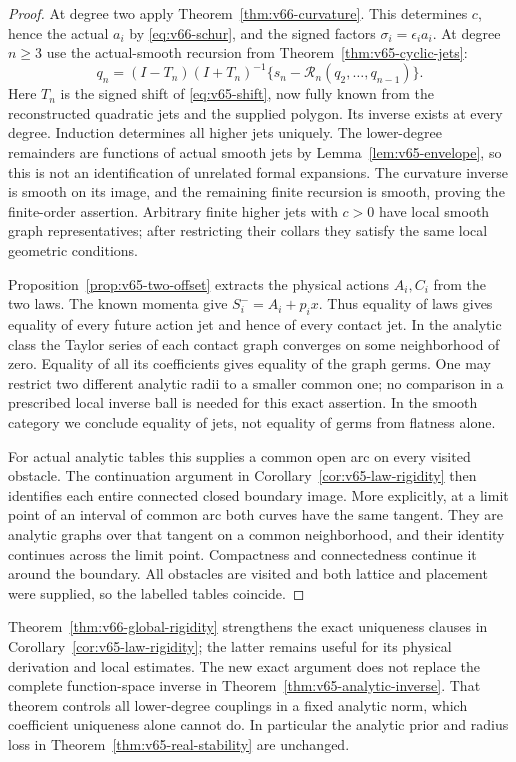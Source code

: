 \begin{proof}
At degree two apply Theorem~\ref{thm:v66-curvature}.  This determines
$c$, hence the actual $a_i$ by \eqref{eq:v66-schur}, and the signed
factors $\sigma_i=\epsilon_i a_i$.  At degree $n\ge3$ use the
actual-smooth recursion from Theorem~\ref{thm:v65-cyclic-jets}:
\[
 q_n=(I-T_n)(I+T_n)^{-1}
                 \{s_n-\mathcal R_n(q_2,\ldots,q_{n-1})\}.
\]
Here $T_n$ is the signed shift of \eqref{eq:v65-shift}, now fully
known from the reconstructed quadratic jets and the supplied polygon.
Its inverse exists at every degree.  Induction determines all higher
jets uniquely.  The lower-degree remainders are functions of actual
smooth jets by Lemma~\ref{lem:v65-envelope}, so this is not an
identification of unrelated formal expansions.  The curvature inverse is
smooth on its image, and the remaining finite recursion is smooth, proving
the finite-order assertion.  Arbitrary finite higher jets with $c>0$
have local smooth graph representatives; after restricting their collars
they satisfy the same local geometric conditions.

Proposition~\ref{prop:v65-two-offset} extracts the physical actions
$A_i,C_i$ from the two laws.  The known momenta give
$S_i^-=A_i+p_i x$.  Thus equality of laws gives equality of every
future action jet and hence of every contact jet.  In the analytic class
the Taylor series of each contact graph converges on some neighborhood
of zero.  Equality of all its coefficients gives equality of the graph
germs.  One may restrict two different analytic radii to a smaller common
one; no comparison in a prescribed local inverse ball is needed for this
exact assertion.  In the smooth category we conclude equality of jets,
not equality of germs from flatness alone.

For actual analytic tables this supplies a common open arc on every
visited obstacle.  The continuation argument in
Corollary~\ref{cor:v65-law-rigidity} then identifies each entire
connected closed boundary image.  More explicitly, at a limit point of
an interval of common arc both curves have the same tangent.  They are
analytic graphs over that tangent on a common neighborhood, and their
identity continues across the limit point.  Compactness and connectedness
continue it around the boundary.  All obstacles are visited and both
lattice and placement were supplied, so the labelled tables coincide.
\end{proof}

Theorem~\ref{thm:v66-global-rigidity} strengthens the exact uniqueness
clauses in Corollary~\ref{cor:v65-law-rigidity}; the latter remains
useful for its physical derivation and local estimates.  The new exact
argument does not replace the complete function-space inverse in
Theorem~\ref{thm:v65-analytic-inverse}.  That theorem controls all
lower-degree couplings in a fixed analytic norm, which coefficient
uniqueness alone cannot do.  In particular the analytic prior and radius
loss in Theorem~\ref{thm:v65-real-stability} are unchanged.


